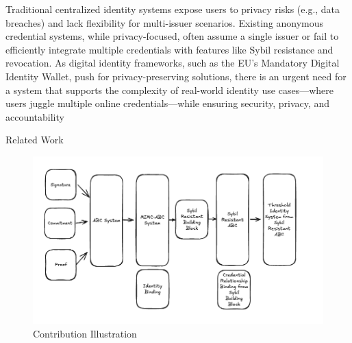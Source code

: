 Traditional centralized identity systems expose users to privacy risks (e.g., data breaches) and lack flexibility for multi-issuer scenarios. Existing anonymous credential systems, while privacy-focused, often assume a single issuer or fail to efficiently integrate multiple credentials with features like Sybil resistance and revocation. As digital identity frameworks, such as the EU’s Mandatory Digital Identity Wallet, push for privacy-preserving solutions, there is an urgent need for a system that supports the complexity of real-world identity use cases—where users juggle multiple online credentials—while ensuring security, privacy, and accountability


Related Work
\begin{figure}
    \centering
    \includegraphics[width=0.75\linewidth]{contribution-illustration.png}
    \caption{Contribution Illustration}
    \label{fig:constribution-illustration}
\end{figure}